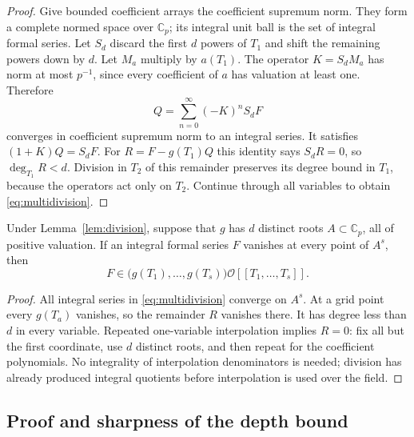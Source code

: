 \begin{proof}
Give bounded coefficient arrays the coefficient supremum norm. They form a
complete normed space over $\mathbb C_p$; its integral unit ball is the
set of integral formal series. Let $S_d$ discard the first $d$ powers of
$T_1$ and shift the remaining powers down by $d$. Let $M_a$ multiply by
$a(T_1)$. The operator $K=S_dM_a$ has norm at most $p^{-1}$, since every
coefficient of $a$ has valuation at least one. Therefore
\[
 Q=\sum_{n=0}^{\infty}(-K)^nS_dF
\]
converges in coefficient supremum norm to an integral series. It satisfies
$(1+K)Q=S_dF$. For $R=F-g(T_1)Q$ this identity says $S_dR=0$, so
$\deg_{T_1}R<d$. Division in $T_2$ of this remainder preserves its degree
bound in $T_1$, because the operators act only on $T_2$. Continue through
all variables to obtain \eqref{eq:multidivision}.
\end{proof}

\begin{lemma}
\label{lem:grid-ideal}
Under Lemma~\ref{lem:division}, suppose that $g$ has $d$ distinct roots
$A\subset\mathbb C_p$, all of positive valuation. If an integral formal
series $F$ vanishes at every point of $A^s$, then
\[
 F\in\bigl(g(T_1),\ldots,g(T_s)\bigr)
       \mathcal O[[T_1,\ldots,T_s]].
\]
\end{lemma}

\begin{proof}
All integral series in \eqref{eq:multidivision} converge on $A^s$. At a
grid point every $g(T_a)$ vanishes, so the remainder $R$ vanishes there.
It has degree less than $d$ in every variable. Repeated one-variable
interpolation implies $R=0$: fix all but the first coordinate, use $d$
distinct roots, and then repeat for the coefficient polynomials. No
integrality of interpolation denominators is needed; division has already
produced integral quotients before interpolation is used over the field.
\end{proof}

\subsection{Proof and sharpness of the depth bound}


